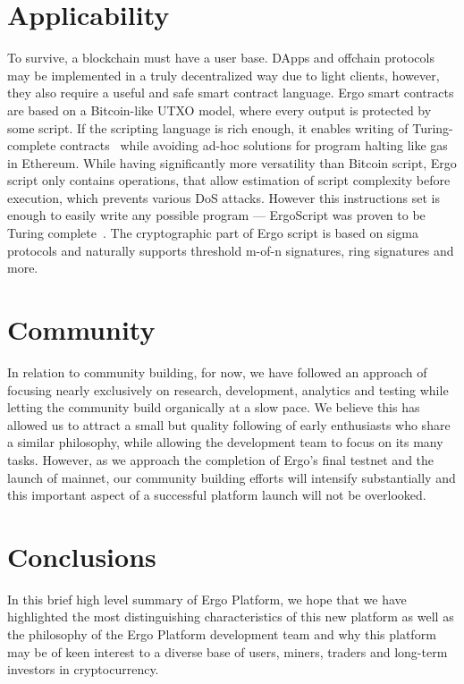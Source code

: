 \documentclass[]{article}
\begin{document}
    \section{Applicability}

    To survive, a blockchain must have a user base. DApps and offchain protocols may be
    implemented in a truly decentralized way due to light clients, however, they also require a useful
    and safe smart contract language. Ergo smart contracts are based on a Bitcoin-like UTXO
    model, where every output is protected by some script. If the scripting language is rich enough,
    it enables writing of Turing-complete contracts~\cite{chepurnoy2018self} while avoiding ad-hoc solutions for
    program halting like gas in Ethereum. While having significantly more versatility than Bitcoin
    script, Ergo script only contains operations, that allow estimation of script complexity before
    execution, which prevents various DoS attacks. However this instructions set is enough to
    easily write any possible program --- ErgoScript was proven to be Turing complete~\cite{chepurnoy2018self}. The
    cryptographic part of Ergo script is based on sigma protocols and naturally supports threshold
    m-of-n signatures, ring signatures and more.

    \section{Community}

    In relation to community building, for now, we have followed an approach of focusing nearly
    exclusively on research, development, analytics and testing while letting the community build
    organically at a slow pace. We believe this has allowed us to attract a small but quality following
    of early enthusiasts who share a similar philosophy, while allowing the development team to
    focus on its many tasks. However, as we approach the completion of Ergo's final testnet and the
    launch of mainnet, our community building efforts will intensify substantially and this important
    aspect of a successful platform launch will not be overlooked.

    \section{Conclusions}

    In this brief high level summary of Ergo Platform, we hope that we have highlighted the most
    distinguishing characteristics of this new platform as well as the philosophy of the Ergo Platform
    development team and why this platform may be of keen interest to a diverse base of users,
    miners, traders and long-term investors in cryptocurrency.

    
\end{document}
